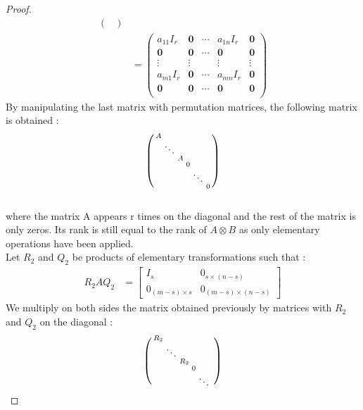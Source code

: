 \documentclass[11pt]{article}
\newcommand{\kp}{\otimes} %
\begin{document}
\begin{proof}
\begin{align*}
\begin{pmatrix}
    \end{pmatrix}\\
    &= \begin{pmatrix}
    a_{11}I_r & \bm{0} & \cdots & a_{1n}I_r & \bm{0}\\
    \bm{0} & \bm{0} & \cdots & \bm{0} & \bm{0}\\
    \vdots & \vdots & & \vdots & \vdots\\
    a_{m1}I_r & \bm{0} & \cdots & a_{mn}I_r & \bm{0}\\
    \bm{0} & \bm{0} & \cdots & \bm{0} & \bm{0}\\
    \end{pmatrix}
\end{align*}
By manipulating the last matrix with permutation matrices, the following matrix is obtained :
\begin{equation*}
    \begin{psmallmatrix}
    A & & & & &\\
    & \ddots & & & &\\
    & & A & & & \\
    & & & 0 & &\\
    & & & & \ddots &\\
    & & & & & 0
    \end{psmallmatrix}
\end{equation*}\\
where the matrix A appears r times on the diagonal and the rest of the matrix is only zeros. Its rank is still equal to the rank of $A\kp B$ as only elementary operations have been applied.\\
Let $R_2$ and $Q_2$ be products of elementary transformations such that :
\begin{align*}
    R_2AQ_2 &=\begin{bmatrix}
    I_s & 0_{s\times(n-s)}\\
    0_{(m-s)\times s} & 0_{(m-s)\times (n-s)}
    \end{bmatrix}
\end{align*}
We multiply on both sides the matrix obtained previously by matrices with $R_2$ and $Q_2$ on the diagonal :
\begin{align*}
    \begin{psmallmatrix}
    R_2 & & & & & \\
    & \ddots & & & & \\
    & & R_2 & & &\\
    & & & 0 & &\\
    & & & & \ddots &\\

\end{psmallmatrix}
\end{align*}
\end{proof}
\end{document}
